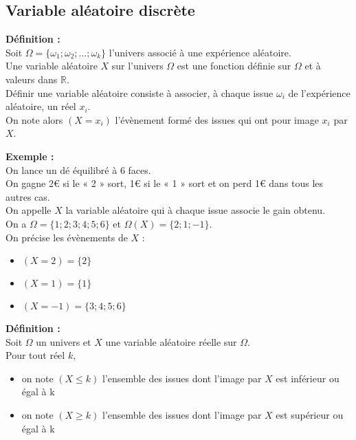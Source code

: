 \documentclass{article}
\begin{document}
\subsection{Variable aléatoire discrète}

\begin{mdframed}[style=definitionStyle]
	\textbf{Définition :} ~\\
	Soit $\Omega=\{\omega_1;\omega_2;\dots;\omega_k\}$ l'univers associé à une expérience aléatoire. \\
	Une variable aléatoire $X$ sur l'univers $\Omega$ est une fonction définie sur $\Omega$ et à valeurs dans $\mathbb{R}$. \\
	Définir une variable aléatoire consiste à associer, à chaque issue $\omega_i$ de l'expérience aléatoire, un réel $x_i$. \\
	On note alors $\left(X=x_i\right)$ l'évènement formé des issues qui ont pour image $x_i$ par $X$.
\end{mdframed}

\textbf{Exemple :} ~\\
On lance un dé équilibré à 6 faces. \\
On gagne 2€ si le « 2 » sort, 1€ si le « 1 » sort et on perd 1€ dans tous les autres cas. \\
On appelle $X$ la variable aléatoire qui à chaque issue associe le gain obtenu. \\

On a $\Omega=\{1;2;3;4;5;6\}$ et $\Omega(X)=\{2;1;-1\}$. \\
On précise les évènements de $X$ :
\vspace{-4pt}
\begin{itemize}
	\item $(X=2)=\{2\}$
	\item $(X=1)=\{1\}$
	\item $(X=-1)=\{3;4;5;6\}$
\end{itemize}

\begin{mdframed}[style=definitionStyle]
	\textbf{Définition :} ~\\
	Soit $\Omega$ un univers et $X$ une variable aléatoire réelle sur $\Omega$.\\
	Pour tout réel $k$,
	\vspace*{-4pt}
	\begin{itemize}
		\item on note $(X\leq k)$ l'ensemble des issues dont l'image par $X$ est inférieur ou égal à k
		\item on note $(X\geq k)$ l'ensemble des issues dont l'image par $X$ est supérieur ou égal à k
	\end{itemize}
\end{mdframed}
\end{document}
